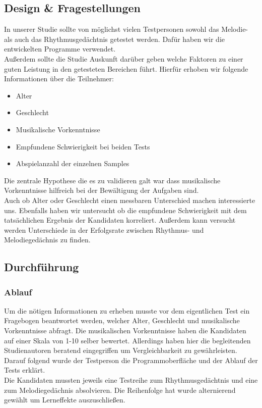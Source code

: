 \documentclass{acm_proc_article-sp}
\begin{document}
\subsection{Design \& Fragestellungen}
In unserer Studie sollte von möglichst vielen Testpersonen sowohl das Melodie- als auch das Rhythmusgedächtnis getestet werden. Dafür haben wir die entwickelten Programme verwendet.\\
Außerdem sollte die Studie Auskunft darüber geben welche Faktoren zu einer guten Leistung in den getesteten Bereichen führt. Hierfür erhoben wir folgende Informationen über die Teilnehmer:\\
\begin{itemize} 
\item Alter
\item Geschlecht
\item Musikalische Vorkenntnisse
\item Empfundene Schwierigkeit bei beiden Tests
\item Abspielanzahl der einzelnen Samples
\end{itemize}
Die zentrale Hypothese die es zu validieren galt war dass musikalische Vorkenntnisse hilfreich bei der Bewältigung der Aufgaben sind. \\
Auch ob Alter oder Geschlecht einen messbaren Unterschied machen interessierte uns. Ebenfalls haben wir untersucht ob die empfundene Schwierigkeit mit dem tatsächlichen Ergebnis der Kandidaten korreliert. 
Außerdem kann versucht werden Unterschiede in der Erfolgsrate zwischen Rhythmus- und Melodiegedächnis zu finden. 
\subsection{Durchführung}

\subsubsection{Ablauf}
Um die nötigen Informationen zu erheben musste vor dem eigentlichen Test ein Fragebogen beantwortet werden, welcher Alter, Geschlecht und musikalische Vorkenntnisse abfragt. Die musikalischen Vorkenntnisse haben die Kandidaten auf einer Skala von 1-10 selber bewertet. Allerdings haben hier die begleitenden Studienautoren beratend eingegriffen um Vergleichbarkeit zu gewährleisten.\\
Darauf folgend wurde der Testperson die Programmoberfläche und der Ablauf der Tests erklärt.\\ 
Die Kandidaten mussten jeweils eine Testreihe zum Rhythmusgedächtnis und eine zum Melodiegedächnis absolvieren. Die Reihenfolge hat wurde alternierend gewählt um Lerneffekte auszuschließen. \\
\end{document}
